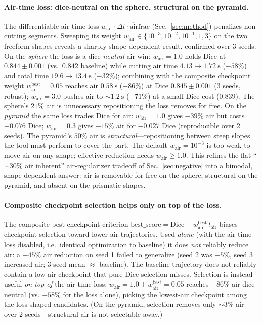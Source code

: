 \paragraph{Air-time loss: dice-neutral on the sphere, structural on the pyramid.}
The differentiable air-time loss $w_{\mathrm{air}} \cdot \overline{\Delta t \cdot \mathrm{airfrac}}$
(Sec.~\ref{sec:method}) penalizes non-cutting segments. Sweeping its weight
$w_{\mathrm{air}}{\in}\{10^{-3},10^{-2},10^{-1},1,3\}$ on the two freeform shapes
reveals a sharply shape-dependent result, confirmed over 3 seeds. On the
\emph{sphere} the loss is a dice-\emph{neutral} air win: $w_{\mathrm{air}}{=}1.0$
holds Dice at $0.844 \pm 0.001$ (vs.\ $0.842$ baseline) while cutting air time
$4.13 \to 1.72~\mathrm{s}$ ($-58\%$) and total time $19.6 \to 13.4~\mathrm{s}$
($-32\%$); combining with the composite checkpoint weight
$w^{\mathrm{best}}_{\mathrm{air}}{=}0.05$ reaches air $0.58~\mathrm{s}$ ($-86\%$)
at Dice $0.845 \pm 0.001$ (3 seeds, robust); $w_{\mathrm{air}}{=}3.0$ pushes air
to $\sim 1.2~\mathrm{s}$ ($-71\%$) at a small Dice cost ($0.839$). The sphere's
$21\%$ air is unnecessary repositioning the loss removes for free. On the
\emph{pyramid} the same loss trades Dice for air: $w_{\mathrm{air}}{=}1.0$ gives
$-39\%$ air but costs $-0.076$ Dice; $w_{\mathrm{air}}{=}0.3$ gives $-15\%$ air
for $-0.027$ Dice (reproducible over 2 seeds). The pyramid's $50\%$ air is
\emph{structural}---repositioning between steep slopes the tool must perform to
cover the part. The default $w_{\mathrm{air}}{=}10^{-3}$ is too weak to move air
on any shape; effective reduction needs $w_{\mathrm{air}} \ge 1.0$. This refines
the flat ``$\sim 30\%$ air inherent'' air-regularizer tradeoff of
Sec.~\ref{sec:negative} into a bimodal, shape-dependent answer: air is
removable-for-free on the sphere, structural on the pyramid, and absent on the
prismatic shapes.

\paragraph{Composite checkpoint selection helps only on top of the loss.}
The composite best-checkpoint criterion
$\mathrm{best\_score} = \mathrm{Dice} - w^{\mathrm{best}}_{\mathrm{air}}\,\tilde t_{\mathrm{air}}$
biases checkpoint selection toward lower-air trajectories. Used \emph{alone}
(with the air-time loss disabled, i.e.\ identical optimization to baseline) it
does \emph{not} reliably reduce air: a $-45\%$ air reduction on seed 1 failed to
generalize (seed 2 was $-5\%$, seed 3 increased air; 3-seed mean $\approx$
baseline). The baseline trajectory does not reliably contain a low-air
checkpoint that pure-Dice selection misses. Selection is instead useful
\emph{on top of} the air-time loss: $w_{\mathrm{air}}{=}1.0 +
w^{\mathrm{best}}_{\mathrm{air}}{=}0.05$ reaches $-86\%$ air dice-neutral (vs.
$-58\%$ for the loss alone), picking the lowest-air checkpoint among the
loss-shaped candidates. (On the pyramid, selection removes only $\sim 3\%$ air
over 2 seeds---structural air is not selectable away.)
